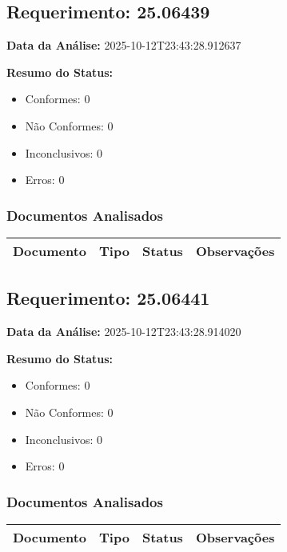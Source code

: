 \documentclass[12pt,a4paper]{article}
\begin{document}
\subsection{Requerimento: 25.06439}

\textbf{Data da Análise:} 2025-10-12T23:43:28.912637

\textbf{Resumo do Status:}
\begin{itemize}
    \item Conformes: 0
    \item Não Conformes: 0
    \item Inconclusivos: 0
    \item Erros: 0
\end{itemize}

\subsubsection{Documentos Analisados}

\begin{longtable}{|p{4cm}|p{2cm}|p{2cm}|p{6cm}|}
\hline
\textbf{Documento} & \textbf{Tipo} & \textbf{Status} & \textbf{Observações} \\
\hline
\endhead
\end{longtable}


\subsection{Requerimento: 25.06441}

\textbf{Data da Análise:} 2025-10-12T23:43:28.914020

\textbf{Resumo do Status:}
\begin{itemize}
    \item Conformes: 0
    \item Não Conformes: 0
    \item Inconclusivos: 0
    \item Erros: 0
\end{itemize}

\subsubsection{Documentos Analisados}

\begin{longtable}{|p{4cm}|p{2cm}|p{2cm}|p{6cm}|}
\hline
\textbf{Documento} & \textbf{Tipo} & \textbf{Status} & \textbf{Observações} \\
\hline
\endhead
\end{longtable}
\end{document}
